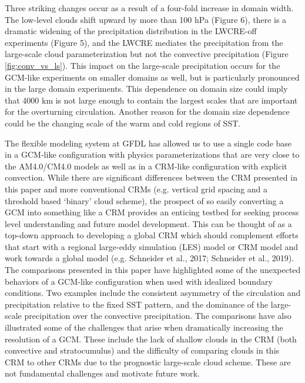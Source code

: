\documentclass[draft]{agujournal2019}
\begin{document}
{Three striking changes occur as a result of a four-fold increase in domain width.  The low-level clouds shift 
upward by more than 100 hPa (Figure 6), there is a dramatic widening of the precipitation distribution in the LWCRE-off experiments (Figure 5),  
and the LWCRE mediates the precipitation from the large-scale cloud parameterization but not the convective precipitation (Figure \ref{fig:conv_vs_ls}).    
This impact on the large-scale precipitation occurs for the GCM-like experiments on smaller domains as well, 
but is particularly pronounced in the large domain experiments.  
This dependence on domain size could imply that 4000 km is not large enough to contain the largest 
scales that are important for the overturning circulation.  Another reason for the domain 
size dependence could be the changing scale of the warm and cold regions of SST.  

The flexible modeling system at GFDL has allowed us to use a single code base in a GCM-like configuration with 
physics parameterizations that are very close to the AM4.0/CM4.0 models as well as in a CRM-like configuration 
with explicit convection.  While there are significant differences between the CRM presented in this paper and more 
conventional CRMs (e.g. vertical grid spacing and a threshold based `binary' cloud scheme), the prospect of so 
easily converting a GCM into something like a CRM provides an enticing testbed for seeking process level 
understanding and future model development.   This can be thought of as a top-down approach to developing 
a global CRM which should complement efforts that start with a regional large-eddy simulation (LES) model or CRM model and work 
towards a global model (e.g. Schneider et al., 2017; Schneider et al., 2019).
The comparisons presented in this paper have highlighted some of the unexpected behaviors of a GCM-like 
configuration when used with idealized boundary conditions.  
Two examples include the consistent asymmetry of the circulation and precipitation relative 
to the fixed SST pattern, and the dominance of the large-scale precipitation over the convective precipitation.  
The comparisons have also illustrated some of the challenges that arise when dramatically increasing the resolution of a GCM.  
These include the lack of shallow clouds in the CRM (both convective and stratocumulus) and the difficulty of comparing 
clouds in this CRM to other CRMs due to the prognostic large-scale cloud scheme.  
These are not fundamental challenges and motivate future work.  

}
\end{document}
